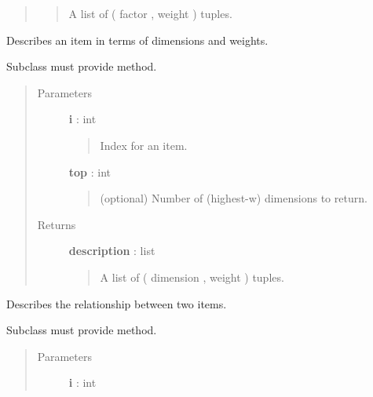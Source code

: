 \documentclass[letterpaper,10pt,english]{sphinxmanual}
\begin{document}
\begin{fulllineitems}
\begin{fulllineitems}
\begin{quote}
\begin{description}
\begin{quote}
A list of ( factor ,  weight ) tuples.
\end{quote}

\end{description}\end{quote}

\end{fulllineitems}


\begin{fulllineitems}
\label{tethne.model.corpus.ldamodel:tethne.model.corpus.ldamodel.LDAModel.item}
Describes an item in terms of dimensions and weights.

Subclass must provide  method.
\begin{quote}\begin{description}
\item[{Parameters}] \leavevmode
\textbf{i} : int
\begin{quote}

Index for an item.
\end{quote}

\textbf{top} : int
\begin{quote}

(optional) Number of (highest-w) dimensions to return.
\end{quote}

\item[{Returns}] \leavevmode
\textbf{description} : list
\begin{quote}

A list of ( dimension , weight ) tuples.
\end{quote}

\end{description}\end{quote}

\end{fulllineitems}


\begin{fulllineitems}
\label{tethne.model.corpus.ldamodel:tethne.model.corpus.ldamodel.LDAModel.item_relationship}
Describes the relationship between two items.

Subclass must provide  method.
\begin{quote}\begin{description}
\item[{Parameters}] \leavevmode
\textbf{i} : int
\begin{quote}


\end{quote}
\end{description}
\end{quote}
\end{fulllineitems}
\end{fulllineitems}
\end{document}
